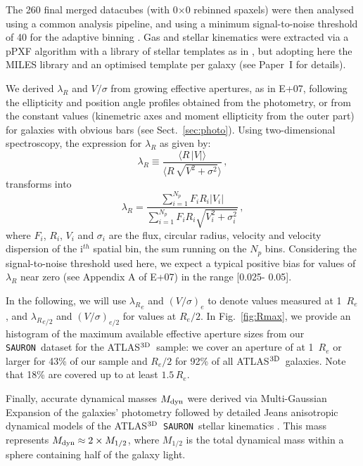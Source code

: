 \documentclass[useAMS,usenatbib,usegraphicx]{mn2e}
\newcommand{\Sauron}{\texttt{SAURON}}
\newcommand{\atlas}{{ATLAS$^{\rm 3D}$}}
\begin{document}
The 260 final merged datacubes (with 0$\times$0 rebinned spaxels) were then analysed using a common analysis pipeline, 
and using a minimum signal-to-noise threshold of 40 for the adaptive binning \citep{CC03}.
Gas and stellar kinematics were extracted via a pPXF algorithm \citep{CappEms04}
with a library of stellar templates as in \cite{Emsellem+04}, but adopting here 
the MILES library \citep{Sanchez+06} and an optimised template per galaxy (see Paper~I for details).

We derived $\lambda_R$ and $V/\sigma$ from growing effective apertures, as
in E+07, following the ellipticity and position angle profiles obtained from the photometry,
or from the constant values (kinemetric axes and moment
ellipticity from the outer part) for galaxies with obvious bars (see
Sect.~\ref{sec:photo}). Using
two-dimensional spectroscopy, the expression for $\lambda_R$ as given by:
\begin{equation}
\lambda_R \equiv \frac{\langle R \, \left| V \right| \rangle }{\langle R \, \sqrt{V^2 + \sigma^2} \rangle}
\, ,
\end{equation} 
transforms into
\begin{equation}
\label{eq:sumLambda}
\lambda_R = \frac{\sum_{i=1}^{N_p} F_i R_i \left| V_i \right|}{\sum_{i=1}^{N_p} F_i R_i \sqrt{V_i^2+\sigma_i^2}} \, ,
\end{equation}
where $F_i$, $R_i$, $V_i$ and $\sigma_i$ are the flux, circular radius, velocity and
velocity dispersion of the i$^{th}$ spatial bin, the sum running on the $N_p$
bins.  Considering the 
signal-to-noise threshold used here, we expect a typical positive bias for values of
$\lambda_R$ near zero (see Appendix A of E+07) in the range [0.025- 0.05].

In the following, we will use ${\lambda_R}_e$ and $(V/\sigma)_e$ to denote
values measured at 1~$R_e$, and ${\lambda_R}_{e/2}$ and $(V/\sigma)_{e/2}$ for values at $R_e / 2$.
In Fig.~\ref{fig:Rmax}, we provide an histogram of the maximum available effective 
aperture sizes from our \Sauron\ dataset for the \atlas\ sample: we cover an
aperture of at 1~$R_e$ or larger for 43\% of our sample and $R_e/2$ for 92\% of all
\atlas\ galaxies. Note that 18\% are covered up to at least $1.5 \,R_e$.

Finally, accurate dynamical masses $M_{\rm dyn}$ were derived via
Multi-Gaussian Expansion \citep{Emsellem+94} of the galaxies' photometry
followed by detailed Jeans anisotropic dynamical models
\citep{Cappellari08,Scott+09} of the \atlas\ \Sauron\ stellar kinematics
\citep{Cap+10}. This
mass represents $M_{\rm dyn} \approx 2 \times M_{1/2}$, where $M_{1/2}$ is the
total dynamical mass within a sphere containing half of the galaxy light.
\end{document}
